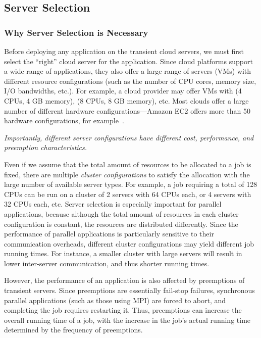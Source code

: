 \subsection{Server Selection}
\label{subsec:server-selection}

\subsubsection{Why Server Selection is Necessary}

Before deploying any application on the transient cloud servers, we must first select the ``right'' cloud server for the application. 
Since cloud platforms support a wide range of applications, they also offer a large range of servers (VMs) with different resource configurations (such as the number of CPU cores, memory size, I/O bandwidths, etc.). 
For example, a cloud provider may offer VMs with (4 CPUs, 4 GB memory), (8 CPUs, 8 GB memory), etc.
Most clouds offer a large number of different hardware configurations---Amazon EC2 offers more than 50 hardware configurations, for example~\cite{amazon-ec2-instance-types}. 

\noindent \emph{Importantly, different server configurations have different cost, performance, and preemption characteristics. }


Even if we assume that the total amount of resources to be allocated to a job is fixed, there are multiple \emph{cluster configurations} to satisfy the allocation with the large number of available server types. 
For example, a job requiring a total of 128 CPUs can be run on a cluster of 2 servers with 64 CPUs each, or 4 servers with 32 CPUs each, etc. 
Server selection is especially important for parallel applications, because although the total amount of resources in each cluster configuration is constant, the resources are distributed differently. 
Since the performance of parallel applications is particularly sensitive to their communication overheads, different cluster configurations may yield different job running times.
For instance, a smaller cluster with large servers will result in lower inter-server communication, and thus shorter running times. 

However, the performance of an application is also affected by preemptions of transient servers.
Since preemptions are essentially fail-stop failures, synchronous parallel applications (such as those using MPI) are forced to abort, and completing the job requires restarting it.
Thus, preemptions can increase the overall running time of a job, with the increase in the job's actual running time determined by the frequency of preemptions.


